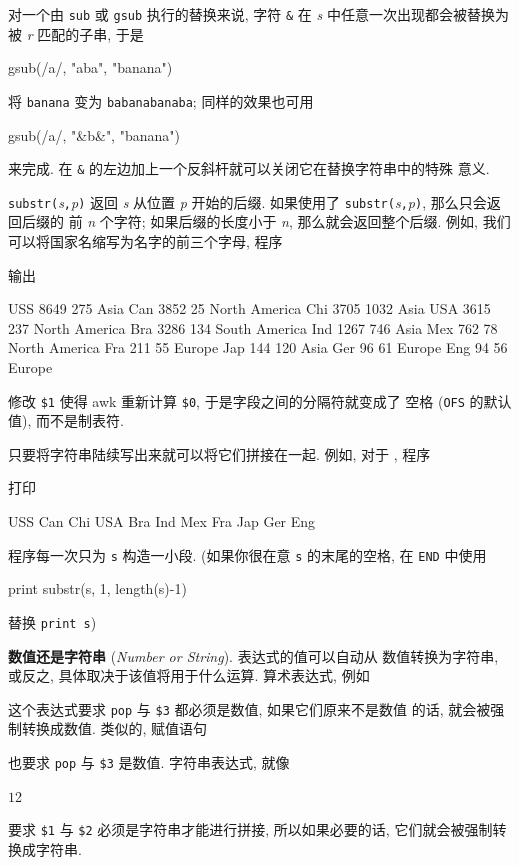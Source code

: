对一个由 \verb'sub' 或 \verb'gsub' 执行的替换来说, 字符 \verb'&' 在
\textit{s} 中任意一次出现都会被替换为被 \textit{r} 匹配的子串, 于是
\begin{awkcode}
    gsub(/a/, "aba", "banana")
\end{awkcode}
将 \verb'banana' 变为 \verb'babanabanaba'; 同样的效果也可用
\begin{awkcode}
    gsub(/a/, "&b&", "banana")
\end{awkcode}
来完成. 在 \verb'&' 的左边加上一个反斜杆就可以关闭它在替换字符串中的特殊
意义.

\verb'substr('\textit{s}\verb','\textit{p}\verb')'
返回 \textit{s} 从位置 \textit{p} 开始的后缀. 如果使用了
\verb'substr('\textit{s}\verb','\textit{p}\verb')', 那么只会返回后缀的
前 \textit{n} 个字符; 如果后缀的长度小于 \textit{n}, 那么就会返回整个后缀.
例如, 我们可以将国家名缩写为名字的前三个字母, 程序
输出
\begin{awkcode}
    USS 8649 275 Asia
    Can 3852 25 North America
    Chi 3705 1032 Asia
    USA 3615 237 North America
    Bra 3286 134 South America
    Ind 1267 746 Asia
    Mex 762 78 North America
    Fra 211 55 Europe
    Jap 144 120 Asia
    Ger 96 61 Europe
    Eng 94 56 Europe
\end{awkcode}
修改 \verb'$1' 使得 awk 重新计算 \verb'$0', 于是字段之间的分隔符就变成了
空格 (\verb'OFS' 的默认值), 而不是制表符.

只要将字符串陆续写出来就可以将它们拼接在一起. 例如, 对于
, 程序
打印
\begin{awkcode}
    USS Can Chi USA Bra Ind Mex Fra Jap Ger Eng
\end{awkcode}
程序每一次只为 \verb's' 构造一小段. (如果你很在意 \verb's' 的末尾的空格,
在 \verb'END' 中使用
\begin{awkcode}
    print substr(s, 1, length(s)-1)
\end{awkcode}
替换 \verb'print s')

\textbf{数值还是字符串} (\emph{Number or String}). 表达式的值可以自动从
数值转换为字符串, 或反之, 具体取决于该值将用于什么运算. 算术表达式, 例如
这个表达式要求 \verb'pop' 与 \verb'$3' 都必须是数值, 如果它们原来不是数值
的话, 就会被强制转换成数值. 类似的, 赋值语句
也要求 \verb'pop' 与 \verb'$3' 是数值. 字符串表达式, 就像
\begin{awkcode}
    $1 $2
\end{awkcode}
要求 \verb'$1' 与 \verb'$2' 必须是字符串才能进行拼接, 所以如果必要的话,
它们就会被强制转换成字符串.

